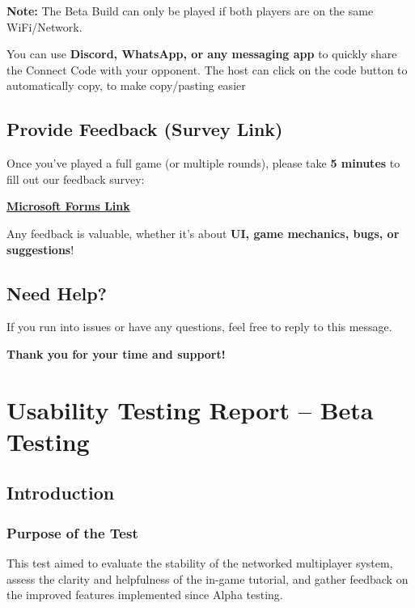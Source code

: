 \documentclass{article}
\begin{document}
\textbf{Note:} The Beta Build can only be played if both players are on the same WiFi/Network.

\begin{tcolorbox}[colback=gray!10, colframe=black, title=Tip]
You can use \textbf{Discord, WhatsApp, or any messaging app} to quickly share the Connect Code with your opponent.
The host can click on the code button to automatically copy, to make copy/pasting easier
\end{tcolorbox}

\subsection{Provide Feedback (Survey Link)}

Once you’ve played a full game (or multiple rounds), please take \textbf{5 minutes} to fill out our feedback survey:

\href{https://forms.office.com/r/nYjE7qfsYG}{\textbf{Microsoft Forms Link}}

Any feedback is valuable, whether it's about \textbf{UI, game mechanics, bugs, or suggestions}!

\subsection{Need Help?}
If you run into issues or have any questions, feel free to reply to this message.

\bigskip

\begin{center}
\textbf{Thank you for your time and support!}
\end{center}


\newpage

\section{Usability Testing Report – Beta Testing}

\subsection{Introduction}

\subsubsection{Purpose of the Test}
This test aimed to evaluate the stability of the networked multiplayer system, assess the clarity and helpfulness of the in-game tutorial, and gather feedback on the improved features implemented since Alpha testing.
\end{document}
